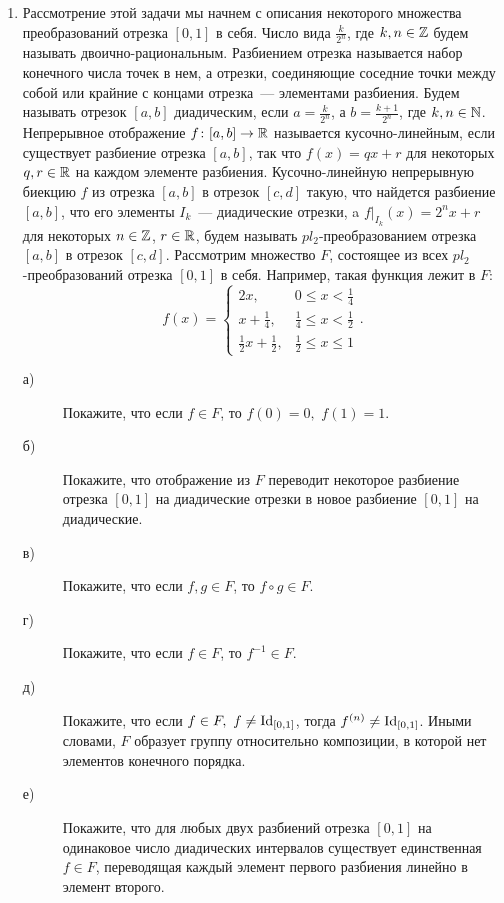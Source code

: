 \begin{enumerate}
\item Рассмотрение этой задачи мы начнем с описания некоторого множества преобразований отрезка $[0,1]$ в себя. Число вида $\frac{k}{2^n}$, где $k,n\in\mathbb{Z}$ будем называть двоично-рациональным. Разбиением отрезка называется набор конечного числа точек в нем, а отрезки, соединяющие соседние точки между собой или крайние с концами отрезка~— элементами разбиения. Будем называть отрезок $[a,b]$ диадическим, если $a=\frac{k}{2^n}$, а $b=\frac{k+1}{2^{n}}$, где $k, n\in\mathbb{N}$. Непрерывное отображение $f\colon [a,b]\to \mathbb{R}$  называется кусочно-линейным, если существует разбиение отрезка $[a,b]$, так что $f(x)=qx+r$ для некоторых $q,r\in\mathbb{R}$ на каждом элементе разбиения. Кусочно-линейную непрерывную биекцию $f$ из отрезка $[a,b]$ в отрезок $[c,d]$ такую, что найдется разбиение $[a,b]$, что его элементы $I_k$~— диадические отрезки, a $f|_{I_k}(x)=2^nx+r$ для некоторых $n\in\mathbb{Z}$, $r\in \mathbb{R}$, будем называть $pl_2$-преобразованием отрезка $[a,b]$ в отрезок $[c,d]$. Рассмотрим множество $F$, состоящее из всех $pl_2$-преобразований отрезка $[0,1]$ в себя. Например, такая функция лежит в $F$:
$$ f(x)=\begin{cases}
2x,& 0\leq x<\frac{1}{4}\\
x+\frac{1}{4},& \frac{1}{4}\leq x<\frac{1}{2}\\
\frac{1}{2}x +\frac{1}{2},& \frac{1}{2}\leq x \leq 1
\end{cases}.
$$
\begin{description}
\item[а)] Покажите, что если $f\in F$, то $f(0)=0,\,\, f(1)=1$.
\item[б)] Покажите, что отображение из $F$ переводит некоторое разбиение отрезка $[0,1]$ на диадические отрезки в новое разбиение $[0,1]$ на диадические.
\item[в)] Покажите, что если $f,g\in F$, то $f\circ g\in F$.
\item[г)] Покажите, что если $f\in F$, то $f^{-1}\in F$.
\item[д)] Покажите, что если $f\in F, \,\, f\neq \operatorname{Id}_{[0,1]}$, тогда $f^{(n)}\neq \operatorname{Id}_{[0,1]}$. Иными словами, $F$ образует группу относительно композиции, в которой нет элементов конечного порядка.
\item[е)] Покажите, что для любых двух разбиений отрезка $[0,1]$ на одинаковое число диадических интервалов существует единственная $f\in F$, переводящая каждый элемент первого разбиения линейно в элемент второго.

\end{description}
\end{enumerate}

